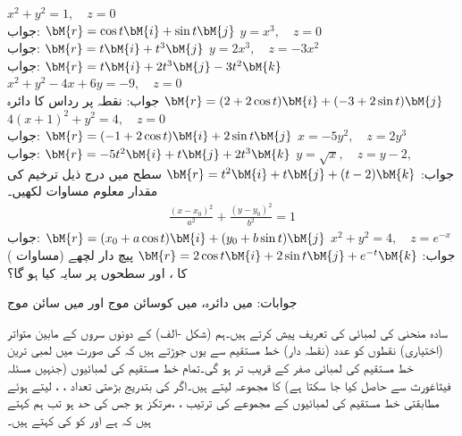  \quad
$x^2+y^2=1,\quad z=0$\\
جواب:
$\bM{r}=\cos t\bM{i}+\sin t\bM{j}$
\quad
$y=x^3,\quad z=0$\\
جواب:
$\bM{r}=t\bM{i}+t^3\bM{j}$
\quad
$y=2x^3,\quad z=-3x^2$\\
جواب:
$\bM{r}=t\bM{i}+2t^3\bM{j}-3t^2\bM{k}$
\quad
$x^2+y^2-4x+6y=-9,\quad z=0$\\
جواب: نقطہ  پر رداس  کا دائرہ \quad
$\bM{r}=(2+2\cos t)\bM{i}+(-3+2\sin t)\bM{j}$
\quad
$4(x+1)^2+y^2=4,\quad z=0$\\
جواب:
$\bM{r}=(-1+2\cos t)\bM{i}+2\sin t\bM{j}$
\quad
$x=-5y^2,\quad z=2y^3$\\
جواب:
$\bM{r}=-5t^2\bM{i}+t\bM{j}+2t^3\bM{k}$
\quad
$y=\sqrt{x},\quad z=y-2,\quad $\\
جواب:
$\bM{r}=t^2\bM{i}+t\bM{j}+(t-2)\bM{k}$
 سطح میں درج ذیل ترخیم کی مقدار معلوم مساوات لکھیں۔
\begin{align*}
\frac{(x-x_0)^2}{a^2}+\frac{(y-y_0)^2}{b^2}=1
\end{align*}
جواب:
$\bM{r}=(x_0+a\cos t)\bM{i}+(y_0+b\sin t)\bM{j}$
\quad
$x^2+y^2=4,\quad z=e^{-x}$\\
جواب:
$\bM{r}=2\cos t\bM{i}+2\sin t\bM{j}+e^{-t}\bM{k}$
پیچ دار لچھے (مساوات ) کا ،  اور  سطحوں پر  سایہ کیا ہو گا؟

جوابات: میں دائرہ،  میں کوسائن موج اور  میں سائن موج

سادہ منحنی  کی لمبائی کی تعریف پیش کرتے ہیں۔ہم  (شکل -الف) کے دونوں سروں کے مابین متواتر (اختیاری) نقطوں کو  عدد (نقطہ دار) خط مستقیم سے یوں جوڑتے ہیں کہ  کی صورت میں لمبی ترین خط مستقیم کی لمبائی صفر کے قریب تر ہو گی۔تمام خط مستقیم کی لمبائیوں (جنہیں مسئلہ فیثاغورث سے حاصل کیا جا سکتا ہے) کا مجموعہ لیتے ہیں۔اگر  کی بتدریج بڑھتی تعداد  ، ،  لیتے ہوئے مطابقتی خط مستقیم کی لمبائیوں کے مجموعے کی ترتیب  ، ، مرتکز ہو جس کی حد  ہو تب ہم کہتے ہیں کہ    ہے اور  کو  کی  کہتے ہیں۔ 

